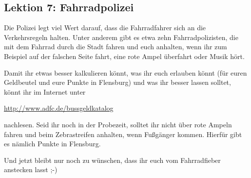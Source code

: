 \begin{multicols}{2}
\subsection*{Lektion 7: Fahrradpolizei}
Die Polizei legt viel Wert darauf, dass die Fahrradfahrer sich an die Verkehrsregeln halten. Unter anderem gibt es etwa zehn Fahrradpolizisten, die mit dem Fahrrad durch die Stadt fahren und euch anhalten, wenn ihr zum Beispiel auf der falschen Seite fahrt, eine rote Ampel überfahrt oder Musik hört.

Damit ihr etwas besser kalkulieren könnt, was ihr euch erlauben könnt (für euren Geldbeutel und eure Punkte in Flensburg) und was ihr besser lassen solltet, könnt ihr im Internet unter

\begin{flushleft}
\hangindent=0.5cm
\url{http://www.adfc.de/bussgeldkatalog}
\end{flushleft}

nachlesen. Seid ihr noch in der Probezeit, solltet ihr nicht über rote Ampeln fahren und beim Zebrastreifen anhalten, wenn Fußgänger kommen. Hierfür gibt es nämlich Punkte in Flensburg.

Und jetzt bleibt nur noch zu wünschen, dass ihr euch vom Fahrradfieber anstecken lasst ;-)

\end{multicols}
